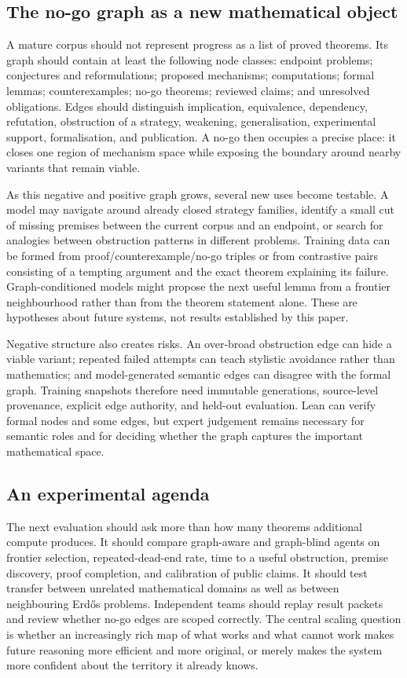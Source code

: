 \documentclass[10pt]{article}
\begin{document}
\subsection{The no-go graph as a new mathematical object}

A mature corpus should not represent progress as a list of proved theorems.
Its graph should contain at least the following node classes: endpoint
problems; conjectures and reformulations; proposed mechanisms; computations;
formal lemmas; counterexamples; no-go theorems; reviewed claims; and unresolved
obligations. Edges should distinguish implication, equivalence, dependency,
refutation, obstruction of a strategy, weakening, generalisation, experimental
support, formalisation, and publication. A no-go then occupies a precise place:
it closes one region of mechanism space while exposing the boundary around
nearby variants that remain viable.

As this negative and positive graph grows, several new uses become testable.
A model may navigate around already closed strategy families, identify a small
cut of missing premises between the current corpus and an endpoint, or search
for analogies between obstruction patterns in different problems. Training
data can be formed from proof/counterexample/no-go triples or from contrastive
pairs consisting of a tempting argument and the exact theorem explaining its
failure. Graph-conditioned models might propose the next useful lemma from a
frontier neighbourhood rather than from the theorem statement alone. These
are hypotheses about future systems, not results established by this paper.

Negative structure also creates risks. An over-broad obstruction edge can hide
a viable variant; repeated failed attempts can teach stylistic avoidance rather
than mathematics; and model-generated semantic edges can disagree with the
formal graph. Training snapshots therefore need immutable generations,
source-level provenance, explicit edge authority, and held-out evaluation.
Lean can verify formal nodes and some edges, but expert judgement remains
necessary for semantic roles and for deciding whether the graph captures the
important mathematical space.

\subsection{An experimental agenda}

The next evaluation should ask more than how many theorems additional compute
produces. It should compare graph-aware and graph-blind agents on frontier
selection, repeated-dead-end rate, time to a useful obstruction, premise
discovery, proof completion, and calibration of public claims. It should test
transfer between unrelated mathematical domains as well as between neighbouring
Erd\H{o}s problems. Independent teams should replay result packets and review
whether no-go edges are scoped correctly. The central scaling question is
whether an increasingly rich map of what works and what cannot work makes
future reasoning more efficient and more original, or merely makes the system
more confident about the territory it already knows.
\end{document}

